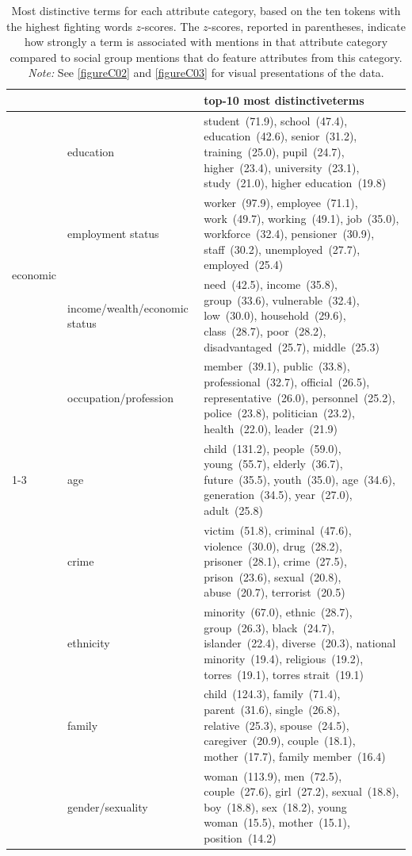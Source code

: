 \begin{table}[!th]
\centering
\caption{Most distinctive terms for each attribute category, based on the ten tokens with the highest fighting words $z$-scores. The $z$-scores, reported in parentheses, indicate how strongly a term is associated with mentions in that attribute category compared to social group mentions that do feature attributes from this category. \emph{Note:} See \ref{figureC02} and \ref{figureC03} for visual presentations of the data.}
\label{tableC03}
\begin{tabular}{lp{}p{}}
\toprule
 &  & top-10 most distinctiveterms \\
\midrule
\multirow[t]{4}{*}{economic} & education & student~(71.9), school~(47.4), education~(42.6), senior~(31.2), training~(25.0), pupil~(24.7), higher~(23.4), university~(23.1), study~(21.0), higher education~(19.8) \\
 & employment status & worker~(97.9), employee~(71.1), work~(49.7), working~(49.1), job~(35.0), workforce~(32.4), pensioner~(30.9), staff~(30.2), unemployed~(27.7), employed~(25.4) \\
 & income/wealth/economic status & need~(42.5), income~(35.8), group~(33.6), vulnerable~(32.4), low~(30.0), household~(29.6), class~(28.7), poor~(28.2), disadvantaged~(25.7), middle~(25.3) \\
 & occupation/profession & member~(39.1), public~(33.8), professional~(32.7), official~(26.5), representative~(26.0), personnel~(25.2), police~(23.8), politician~(23.2), health~(22.0), leader~(21.9) \\
\cmidrule(lr){1-3}
\multirow[t]{10}{*}{noneconomic} & age & child~(131.2), people~(59.0), young~(55.7), elderly~(36.7), future~(35.5), youth~(35.0), age~(34.6), generation~(34.5), year~(27.0), adult~(25.8) \\
 & crime & victim~(51.8), criminal~(47.6), violence~(30.0), drug~(28.2), prisoner~(28.1), crime~(27.5), prison~(23.6), sexual~(20.8), abuse~(20.7), terrorist~(20.5) \\
 & ethnicity & minority~(67.0), ethnic~(28.7), group~(26.3), black~(24.7), islander~(22.4), diverse~(20.3), national minority~(19.4), religious~(19.2), torres~(19.1), torres strait~(19.1) \\
 & family & child~(124.3), family~(71.4), parent~(31.6), single~(26.8), relative~(25.3), spouse~(24.5), caregiver~(20.9), couple~(18.1), mother~(17.7), family member~(16.4) \\
 & gender/sexuality & woman~(113.9), men~(72.5), couple~(27.6), girl~(27.2), sexual~(18.8), boy~(18.8), sex~(18.2), young woman~(15.5), mother~(15.1), position~(14.2) \\

\end{tabular}
\end{table}
